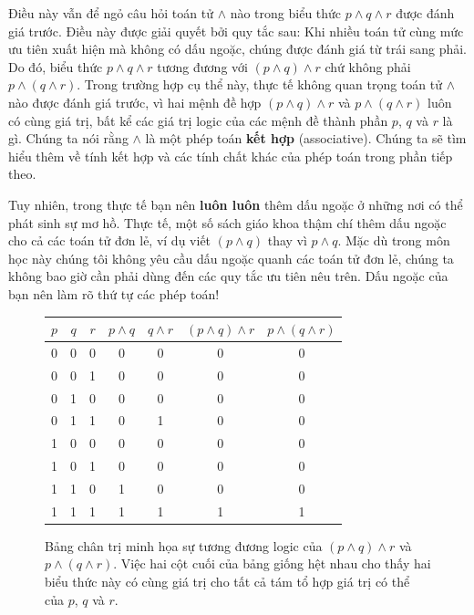 Điều này vẫn để ngỏ câu hỏi toán tử $\land$ nào trong biểu thức $p \land q \land r$ được đánh giá trước. Điều này được giải quyết bởi quy tắc sau: Khi nhiều toán tử cùng mức ưu tiên xuất hiện mà không có dấu ngoặc, chúng được đánh giá từ trái sang phải. Do đó, biểu thức $p \land q \land r$ tương đương với $(p \land q) \land r$ chứ không phải $p \land (q \land r)$. Trong trường hợp cụ thể này, thực tế không quan trọng toán tử $\land$ nào được đánh giá trước, vì hai mệnh đề hợp $(p \land q) \land r$ và $p \land (q \land r)$ luôn có cùng giá trị, bất kể các giá trị logic của các mệnh đề thành phần $p$, $q$ và $r$ là gì. Chúng ta nói rằng $\land$ là một phép toán \textbf{kết hợp} (associative). Chúng ta sẽ tìm hiểu thêm về tính kết hợp và các tính chất khác của phép toán trong phần tiếp theo.

\begin{warningbox}
Tuy nhiên, trong thực tế bạn nên \textbf{luôn luôn} thêm dấu ngoặc ở những nơi có thể phát sinh sự mơ hồ. Thực tế, một số sách giáo khoa thậm chí thêm dấu ngoặc cho cả các toán tử đơn lẻ, ví dụ viết $(p \land q)$ thay vì $p \land q$. Mặc dù trong môn học này chúng tôi không yêu cầu dấu ngoặc quanh các toán tử đơn lẻ, chúng ta không bao giờ cần phải dùng đến các quy tắc ưu tiên nêu trên. Dấu ngoặc của bạn nên làm rõ thứ tự các phép toán!
\end{warningbox}

\begin{figure}[h]
\centering
\begin{tabular}{ccc|cc|cc}
\hline
$p$ & $q$ & $r$ & $p \land q$ & $q \land r$ & $(p \land q) \land r$ & $p \land (q \land r)$ \\
\hline
0 & 0 & 0 & 0 & 0 & 0 & 0 \\
0 & 0 & 1 & 0 & 0 & 0 & 0 \\
0 & 1 & 0 & 0 & 0 & 0 & 0 \\
0 & 1 & 1 & 0 & 1 & 0 & 0 \\
1 & 0 & 0 & 0 & 0 & 0 & 0 \\
1 & 0 & 1 & 0 & 0 & 0 & 0 \\
1 & 1 & 0 & 1 & 0 & 0 & 0 \\
1 & 1 & 1 & 1 & 1 & 1 & 1 \\
\hline
\end{tabular}
\caption{Bảng chân trị minh họa sự tương đương logic của $(p \land q) \land r$ và $p \land (q \land r)$. Việc hai cột cuối của bảng giống hệt nhau cho thấy hai biểu thức này có cùng giá trị cho tất cả tám tổ hợp giá trị có thể của $p$, $q$ và $r$.}
\label{fig:assoc_and}
\end{figure}

